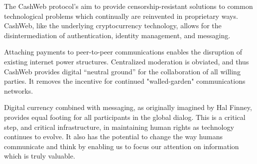 \documentclass{article}
\begin{document}
The CashWeb protocol's aim to provide censorship-resistant solutions to common technological problems which continually are reinvented in proprietary ways. CashWeb, like the underlying cryptocurrency technology, allows for the disintermediation of authentication, identity management, and messaging.

Attaching payments to peer-to-peer communications enables the disruption of existing internet power structures. Centralized moderation is obviated, and thus CashWeb provides digital ``neutral ground'' for the collaboration of all willing parties. It removes the incentive for continued "walled-garden" communications networks.

Digital currency combined with messaging, as originally imagined by Hal Finney\cite{finney2004rpow}, provides equal footing for all participants in the global dialog. This is a critical step, and critical infrastructure, in maintaining human rights as technology continues to evolve. It also has the potential to change the way humans communicate and think by enabling us to focus our attention on information which is truly valuable.



\end{document}
